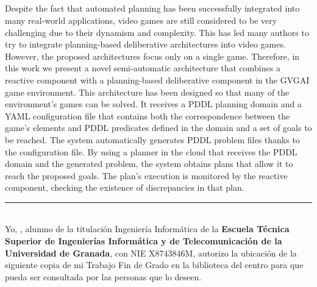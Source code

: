 \thispagestyle{empty}


\begin{center}
{\large\bfseries \tituloingles}\\
\end{center}
\begin{center}
\autor\\
\end{center}

\\

\vspace{0.7cm}
\\

Despite the fact that automated planning has been successfully integrated into many real-world
applications, video games are still considered to be very challenging due to their dynamism
and complexity. This has led many authors to try to integrate planning-based deliberative architectures
into video games. However, the proposed architectures focus only on a single game. Therefore, in this
work we present a novel semi-automatic architecture that combines a reactive component with a
planning-based deliberative component in the GVGAI game environment. This architecture has been designed
so that many of the environment's games can be solved. It receives a PDDL planning domain and a YAML
configuration file that contains both the correspondence between the game's elements and PDDL predicates defined
in the domain and a set of goals to be reached. The system automatically generates PDDL problem files thanks
to the configuration file. By using a planner in the cloud that receives the PDDL domain and the
generated problem, the system obtains plans that allow it to reach the proposed goals. The plan's execution
is monitored by the reactive component, checking the existence of discrepancies in that plan.

\cleardoublepage
\thispagestyle{empty}

\noindent\rule[-1ex]{\textwidth}{2pt}\\[4.5ex]

Yo, \textbf{\autor}, alumno de la titulación Ingeniería Informática de la \textbf{Escuela Técnica Superior
de Ingenierías Informática y de Telecomunicación de la Universidad de Granada}, con NIE X8743846M, autorizo la
ubicación de la siguiente copia de mi Trabajo Fin de Grado en la biblioteca del centro para que pueda ser
consultada por las personas que lo deseen.

